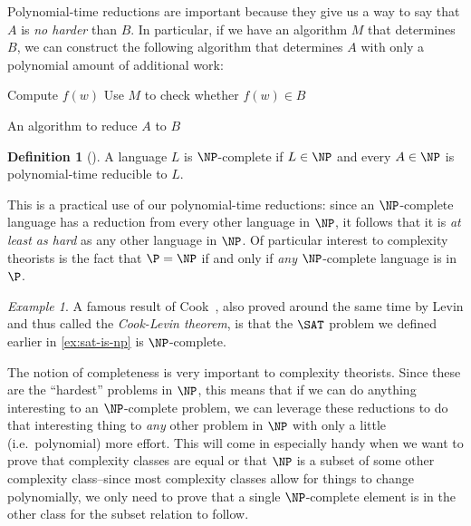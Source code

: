 \documentclass[english]{reedthesis}
\theoremstyle{plain}
\theoremstyle{definition}
\newtheorem{defn}[defn]{Definition}
\theoremstyle{remark}
\newtheorem{example}{Example}[thm]
\begin{document}
Polynomial-time reductions are important because they give us a way to say that
$A$ is \emph{no harder} than $B$. In particular, if we have an algorithm $M$
that determines $B$, we can construct the following algorithm that determines
$A$ with only a polynomial amount of additional work:

\begin{algorithm}[H]
  Compute $f(w)$\;
  Use $M$ to check whether $f(w) \in B$\;
  \;
  \caption{An algorithm to reduce $A$ to $B$}
\end{algorithm}

\begin{defn}[{\cite[Def.\ 7.34]{Sip97}}]\label{def:np-complete}
  A language $L$ is $\NP$-complete if $L \in \NP$ and every $A \in \NP$ is
  polynomial-time reducible to $L$.
\end{defn}

This is a practical use of our polynomial-time reductions: since an
$\NP$-complete language has a reduction from every other language in $\NP$, it
follows that it is \emph{at least as hard} as any other language in $\NP$. Of
particular interest to complexity theorists is the fact that $\P = \NP$ if and
only if \emph{any} $\NP$-complete language is in $\P$.

\begin{example}\label{ex:sat-is-complete}
  A famous result of Cook~\cite{Cook71}, also proved around the same time by
  Levin and thus called the \emph{Cook-Levin theorem}, is that the $\SAT$
  problem we defined earlier in \cref{ex:sat-is-np} is $\NP$-complete.
\end{example}

The notion of completeness is very important to complexity theorists. Since
these are the ``hardest'' problems in $\NP$, this means that if we can do
anything interesting to an $\NP$-complete problem, we can leverage these
reductions to do that interesting thing to \emph{any} other problem in $\NP$
with only a little (i.e.\ polynomial) more effort. This will come in especially
handy when we want to prove that complexity classes are equal or that $\NP$ is a
subset of some other complexity class--since most complexity classes allow for
things to change polynomially, we only need to prove that a single
$\NP$-complete element is in the other class for the subset relation to follow.
\end{document}
